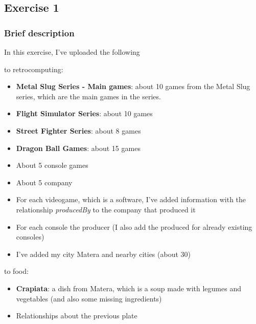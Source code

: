 \subsection{Exercise 1}

\subsubsection{Brief description}


In this exercise, I've uploaded the following 

to retrocomputing:
\begin{itemize}
    \item \textbf{Metal Slug Series - Main games}: about 10 games from the Metal Slug series, which are the main games in the series.
    \item \textbf{Flight Simulator Series}: about 10 games
    \item \textbf{Street Fighter Series}: about 8 games
    \item \textbf{Dragon Ball Games}: about 15 games
    \item About 5 console games
    \item About 5 company
    \item For each videogame, which is a software, I've added information with the relationship \textit{producedBy} to the company that produced it
    \item For each console the producer (I also add the produced for already existing consoles)
    \item I've added my city Matera and nearby cities (about 30)
\end{itemize}

to food:
\begin{itemize}
    \item \textbf{Crapiata}: a dish from Matera, which is a soup made with legumes and vegetables (and also some missing ingredients)
    \item Relationships about the previous plate
\end{itemize}




